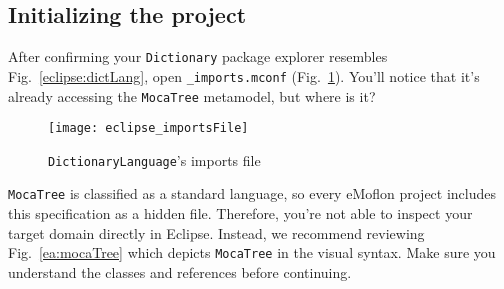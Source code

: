 \newpage
\hypertarget{initialize tex}{}
\subsection{Initializing the project}
\texHeader



After confirming your \texttt{Dictionary} package explorer resembles Fig.~\ref{eclipse:dictLang}, open \texttt{\_imports.mconf}
(Fig.~\ref{eclipse:standardImports}). You'll notice that it's already accessing the \texttt{MocaTree} metamodel, but where is it?

\begin{figure}[htbp]
\begin{center}
  \texttt{[image: eclipse\_importsFile]}
  \caption{\texttt{DictionaryLanguage}'s imports file}
  \label{eclipse:standardImports}
\end{center}
\end{figure}

\texttt{MocaTree} is classified as a standard language, so every eMoflon project includes this specification as a hidden file. Therefore, you're not able to
inspect your target domain directly in Eclipse. Instead, we recommend reviewing Fig.~\ref{ea:mocaTree} which depicts \texttt{MocaTree} in the visual syntax.
Make sure you understand the classes and references before continuing.

